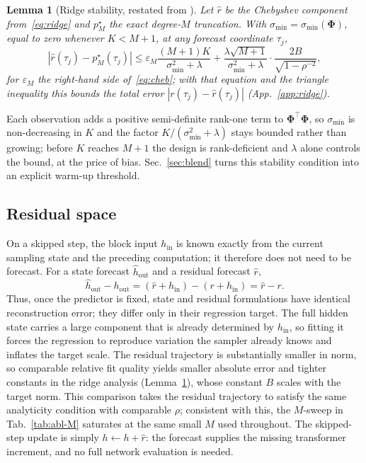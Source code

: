 \documentclass{article} %
\newtheorem{lemma}{Lemma}
\begin{document}
\begin{lemma}[{Ridge stability, restated from \citealt[Thm.~3.3]{spectrum}}]
\label{lem:ridge}
Let $\hat{r}$ be the Chebyshev component from~\eqref{eq:ridge} and
$p_M^\star$ the exact degree-$M$ truncation. With
$\sigma_{\min} = \sigma_{\min}(\mathbf{\Phi})$, equal to zero whenever
$K < M{+}1$, at any forecast coordinate $\tau_j$,
\begin{equation}
  |\hat{r}(\tau_j) - p_M^\star(\tau_j)| \le
  \varepsilon_M \frac{(M{+}1)K}{\sigma_{\min}^2 + \lambda}
  + \frac{\lambda\sqrt{M{+}1}}{\sigma_{\min}^2 + \lambda}
    \cdot \frac{2B}{\sqrt{1-\rho^{-2}}},
\end{equation}
for $\varepsilon_M$ the right-hand side of~\eqref{eq:cheb}; with that
equation and the triangle inequality this bounds the total error
$|r(\tau_j) - \hat{r}(\tau_j)|$ (App.~\ref{app:ridge}).
\end{lemma}
Each observation adds a positive semi-definite rank-one term to
$\mathbf{\Phi}^\top\mathbf{\Phi}$, so $\sigma_{\min}$ is non-decreasing
in $K$ and the factor $K/(\sigma_{\min}^2 + \lambda)$ stays bounded
rather than growing; before $K$ reaches $M{+}1$ the design is
rank-deficient and $\lambda$ alone controls the bound, at the price of
bias. Sec.~\ref{sec:blend} turns this stability condition into an
explicit warm-up threshold.

\subsection{Residual space}
\label{sec:residual}
On a skipped step, the block input $h_{\mathrm{in}}$ is known exactly
from the current sampling state and the preceding computation; it
therefore does not need to be forecast. For a state forecast
$\hat{h}_{\mathrm{out}}$ and a residual forecast $\hat{r}$,
\begin{equation}
  \hat{h}_{\mathrm{out}} - h_{\mathrm{out}}
  = (\hat{r} + h_{\mathrm{in}}) - (r + h_{\mathrm{in}})
  = \hat{r} - r.
\end{equation}
Thus, once the predictor is fixed, state and residual formulations have
identical reconstruction error; they differ only in their regression
target. The full hidden state carries a large component that is already
determined by $h_{\mathrm{in}}$, so fitting it forces the regression to
reproduce variation the sampler already knows and inflates the target
scale. The residual trajectory is substantially smaller in norm, so
comparable relative fit quality yields smaller absolute error and
tighter constants in the ridge analysis (Lemma~\ref{lem:ridge}), whose
constant $B$ scales with the target norm. This comparison takes the
residual trajectory to satisfy the same analyticity condition with
comparable $\rho$; consistent with this, the $M$-sweep in
 Tab.~\ref{tab:abl-M} saturates at the same small $M$ used
throughout. The skipped-step update is simply $h \leftarrow h + \hat{r}$: the
forecast supplies the missing transformer increment, and no full
network evaluation is needed.
\end{document}
